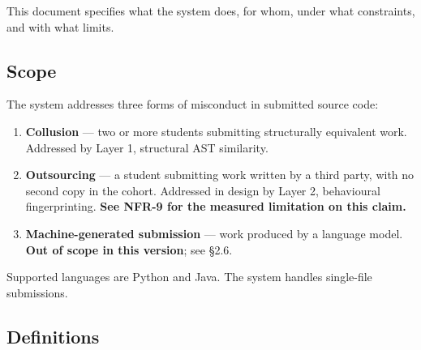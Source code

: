 This document specifies what the system does, for whom, under what
constraints, and with what limits.

\hypertarget{scope}{%
\subsection{Scope}\label{scope}}

The system addresses three forms of misconduct in submitted source code:

\begin{enumerate}
\def\labelenumi{\arabic{enumi}.}
\tightlist
\item
  \textbf{Collusion} --- two or more students submitting structurally
  equivalent work. Addressed by Layer 1, structural AST similarity.
\item
  \textbf{Outsourcing} --- a student submitting work written by a third
  party, with no second copy in the cohort. Addressed in design by Layer
  2, behavioural fingerprinting. \textbf{See NFR-9 for the measured
  limitation on this claim.}
\item
  \textbf{Machine-generated submission} --- work produced by a language
  model. \textbf{Out of scope in this version}; see \S{}2.6.
\end{enumerate}

Supported languages are Python and Java. The system handles single-file
submissions.

\hypertarget{definitions}{%
\subsection{Definitions}\label{definitions}}

